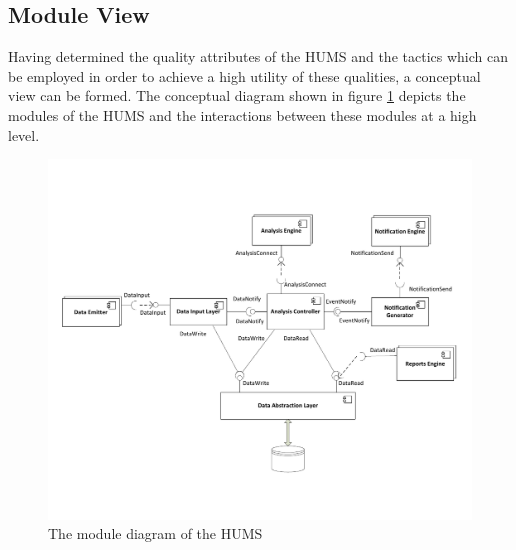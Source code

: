 \documentclass[10pt,a4paper]{article}
\begin{document}
\subsection{Module View}
Having determined the quality attributes of the HUMS and the tactics which can be employed in order to achieve a high utility of these qualities, a conceptual view can be formed. The conceptual diagram shown in figure \ref{fig:moduleDiagram} depicts the modules of the HUMS and the interactions between these modules at a high level.

\begin{figure}[ht!]
\includegraphics[width=13cm]{images/moduleDiagram.pdf}
\caption{The module diagram of the HUMS}
\label{fig:moduleDiagram}
\end{figure}
\end{document}
